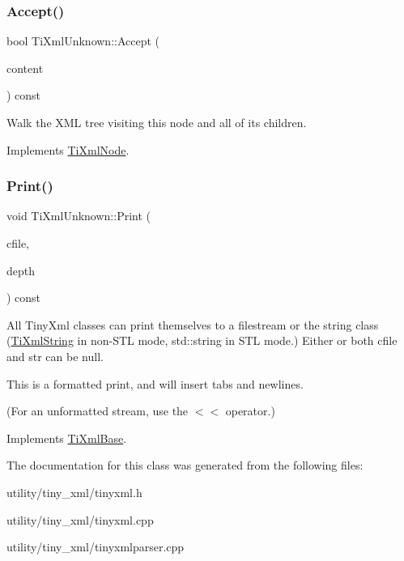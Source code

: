 \subsubsection{\texorpdfstring{Accept()}{Accept()}}
{\footnotesize\ttfamily bool Ti\+Xml\+Unknown\+::\+Accept (\begin{DoxyParamCaption}\item[{\hyperlink{class_ti_xml_visitor}{Ti\+Xml\+Visitor} $\ast$}]{content }\end{DoxyParamCaption}) const\hspace{0.3cm}{\ttfamily [virtual]}}

Walk the X\+ML tree visiting this node and all of its children. 

Implements \hyperlink{class_ti_xml_node_acc0f88b7462c6cb73809d410a4f5bb86}{Ti\+Xml\+Node}.

\mbox{\label{class_ti_xml_unknown_a5793fbc48ab3419783c0e866ca2d334e}} 
\subsubsection{\texorpdfstring{Print()}{Print()}}
{\footnotesize\ttfamily void Ti\+Xml\+Unknown\+::\+Print (\begin{DoxyParamCaption}\item[{F\+I\+LE $\ast$}]{cfile,  }\item[{int}]{depth }\end{DoxyParamCaption}) const\hspace{0.3cm}{\ttfamily [virtual]}}

All Tiny\+Xml classes can print themselves to a filestream or the string class (\hyperlink{class_ti_xml_string}{Ti\+Xml\+String} in non-\/\+S\+TL mode, std\+::string in S\+TL mode.) Either or both cfile and str can be null.

This is a formatted print, and will insert tabs and newlines.

(For an unformatted stream, use the $<$$<$ operator.) 

Implements \hyperlink{class_ti_xml_base_a0de56b3f2ef14c65091a3b916437b512}{Ti\+Xml\+Base}.



The documentation for this class was generated from the following files\+:\begin{DoxyCompactItemize}
\item 
utility/tiny\+\_\+xml/tinyxml.\+h\item 
utility/tiny\+\_\+xml/tinyxml.\+cpp\item 
utility/tiny\+\_\+xml/tinyxmlparser.\+cpp\end{DoxyCompactItemize}
